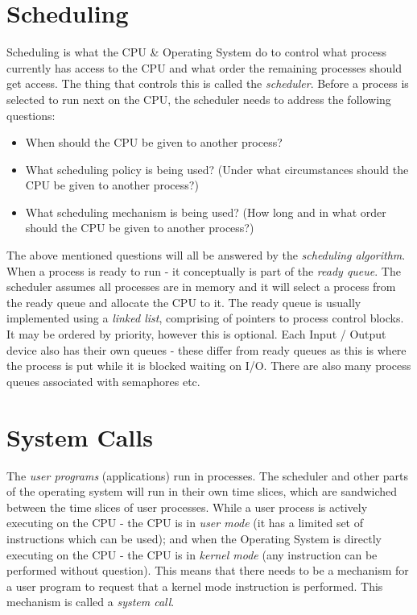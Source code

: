 \section{Scheduling}
Scheduling is what the CPU \& Operating System do to control what process currently has access to the CPU and what order the remaining processes should get access. The thing that controls this is called the \textit{scheduler}. Before a process is selected to run next on the CPU, the scheduler needs to address the following questions:
\begin{itemize}
    \item When should the CPU be given to another process?
    \item What scheduling policy is being used? (Under what circumstances should the CPU be given to another process?)
    \item What scheduling mechanism is being used? (How long and in what order should the CPU be given to another process?)
\end{itemize}
The above mentioned questions will all be answered by the \textit{scheduling algorithm}.\\

When a process is ready to run - it conceptually is part of the \textit{ready queue}. The scheduler assumes all processes are in memory and it will select a process from the ready queue and allocate the CPU to it. The ready queue is usually implemented using a \textit{linked list}, comprising of pointers to process control blocks. It may be ordered by priority, however this is optional. Each Input / Output device also has their own queues - these differ from ready queues as this is where the process is put while it is blocked waiting on I/O. There are also many process queues associated with semaphores etc.

\section{System Calls}
The \textit{user programs} (applications) run in processes. The scheduler and other parts of the operating system will run in their own time slices, which are sandwiched between the time slices of user processes. While a user process is actively executing on the CPU - the CPU is in \textit{user mode} (it has a limited set of instructions which can be used); and when the Operating System is directly executing on the CPU - the CPU is in \textit{kernel mode} (any instruction can be performed without question). This means that there needs to be a mechanism for a user program to request that a kernel mode instruction is performed. This mechanism is called a \textit{system call}.\\

